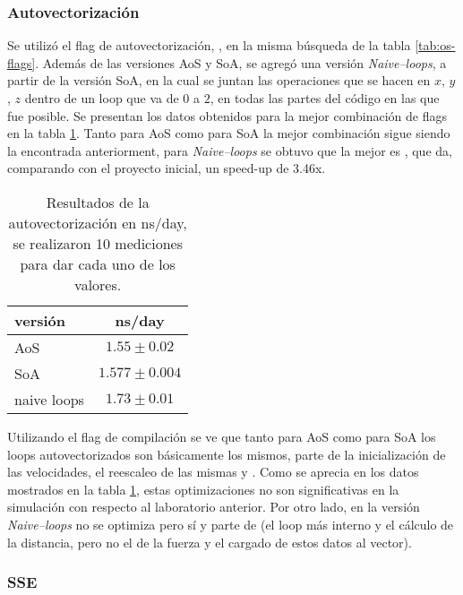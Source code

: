 \documentclass[a4paper,spanish,12pt,twoside]{article}
\begin{document}
\subsubsection*{Autovectorización}

Se utilizó el flag de autovectorización, , en la misma búsqueda de la tabla \ref{tab:os-flags}. Además de las versiones AoS y SoA, se agregó una versión \textit{Naive--loops}, a partir de la versión SoA, en la cual se juntan las operaciones que se hacen en $x$, $y$, $z$ dentro de un loop que va de $0$ a $2$, en todas las partes del código en las que fue posible. Se presentan los datos obtenidos para la mejor combinación de flags en la tabla \ref{tab:autovec}. Tanto para AoS como para SoA la mejor combinación sigue siendo la encontrada anteriorment, para \textit{Naive--loops} se obtuvo que la mejor es , que da, comparando con el proyecto inicial, un speed-up de 3.46x.

\begin{table}[h]
	\centering
	\caption{Resultados de la autovectorización en ns/day, se realizaron 10 mediciones para dar cada uno de los valores.}
	\label{tab:autovec}
	\begin{tabular}{|l|c|}
		\hline
	    versión  	& ns/day           \\
	    \hline
		AoS         & $1.55 \pm 0.02$  \\ 
		SoA         & $1.577 \pm 0.004$  \\
		naive loops & $1.73 \pm 0.01$  \\
		\hline
	\end{tabular}
\end{table}

Utilizando el flag de compilación  se ve que tanto para AoS como para SoA los loops autovectorizados son básicamente los mismos, parte de la inicialización de las velocidades, el reescaleo de las mismas y . Como se aprecia en los datos mostrados en la tabla \ref{tab:autovec}, estas optimizaciones no son significativas en la simulación con respecto al laboratorio anterior. Por otro lado, en la versión \textit{Naive--loops} no se optimiza  pero sí  y parte de  (el loop más interno y el cálculo de la distancia, pero no el de la fuerza y el cargado de estos datos al vector).

\subsubsection*{SSE}
\end{document}
